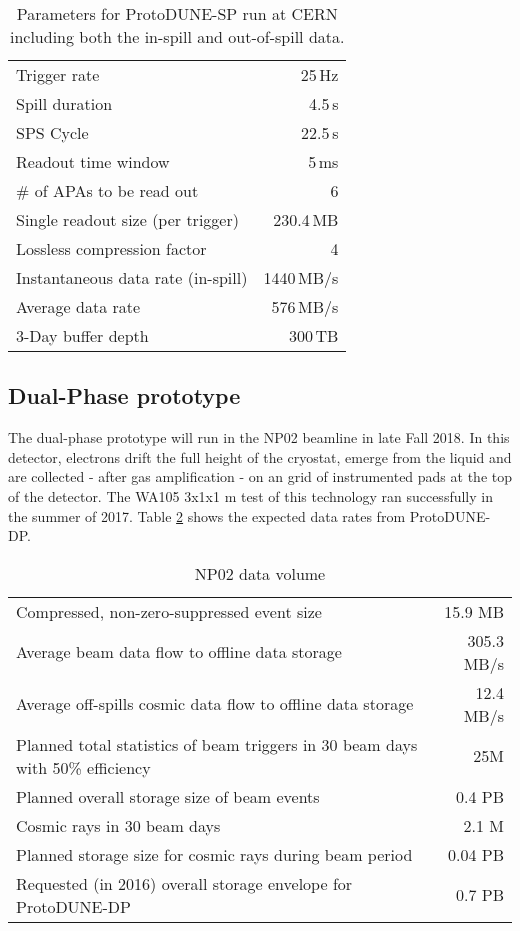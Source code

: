\begin{table}[htbp]
  \centering
  \begin{tabular}[h]{l|r}
\hline
    Trigger rate & 25\,Hz \\
    Spill duration & 4.5\,s\\
    SPS Cycle & 22.5\,s \\
    Readout time window & 5\,ms \\
    \# of APAs to be read out & 6 \\
    \hline
    Single readout size (per trigger) & 230.4\,MB \\
    Lossless compression factor & 4 \\
    Instantaneous data rate (in-spill) & 1440\,MB/s \\
    Average data rate & 576\,MB/s \\
    \hline
    3-Day buffer depth & 300\,TB \\
    \hline
  \end{tabular}
  \caption{Parameters for ProtoDUNE-SP run at CERN including both
  the in-spill and out-of-spill data.}
  \label{tab:np04_data_rate}
\end{table}
\subsection{Dual-Phase prototype}

The dual-phase prototype will run in the NP02 beamline in late Fall 2018.  In this detector, electrons drift the full height of the cryostat, emerge from the liquid and are collected - after gas amplification - on an grid of instrumented pads at the top of the detector.  The WA105 3x1x1 m test of this technology ran successfully in the summer of 2017\cite{Murphy:20170516}.  Table \ref{tab:np02_data_rate} shows the expected data rates from ProtoDUNE-DP. 

\begin{table}[htbp]
  \centering
  \begin{tabular}[h]{l|r}
\hline
     Compressed, non-zero-suppressed event size & 15.9 MB\\
    Average beam data flow to offline data storage &   305.3 MB/s  \\
    Average off-spills cosmic data flow to offline data storage &   12.4 MB/s\\
    Planned total statistics of beam triggers in 30 beam days with 50\% efficiency&25M\\
    Planned overall storage size of beam events&   0.4 PB\\
   Cosmic rays in 30  beam days&  2.1  M\\
   Planned storage size for cosmic rays during beam period&  0.04 PB\\
   Requested (in 2016) overall storage envelope for ProtoDUNE-DP&0.7 PB \\
    \hline
  \end{tabular}
 \caption{NP02 data volume}
  \label{tab:np02_data_rate}
\end{table}

